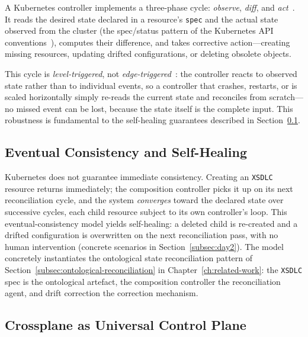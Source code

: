 A Kubernetes controller implements a three-phase cycle: \textit{observe}, \textit{diff}, and \textit{act}~\cite{k8s-controllers}. It reads the desired state declared in a resource's \texttt{spec} and the actual state observed from the cluster (the spec/status pattern of the Kubernetes API conventions~\cite{k8s-api-conventions}), computes their difference, and takes corrective action---creating missing resources, updating drifted configurations, or deleting obsolete objects.

This cycle is \textit{level-triggered}, not \textit{edge-triggered}~\cite{k8s-up-and-running}: the controller reacts to observed state rather than to individual events, so a controller that crashes, restarts, or is scaled horizontally simply re-reads the current state and reconciles from scratch---no missed event can be lost, because the state itself is the complete input. This robustness is fundamental to the self-healing guarantees described in Section~\ref{subsec:self-healing}.

\subsection{Eventual Consistency and Self-Healing}
\label{subsec:self-healing}

Kubernetes does not guarantee immediate consistency. Creating an \texttt{XSDLC} resource returns immediately; the composition controller picks it up on its next reconciliation cycle, and the system \textit{converges} toward the declared state over successive cycles, each child resource subject to its own controller's loop. This eventual-consistency model yields self-healing: a deleted child is re-created and a drifted configuration is overwritten on the next reconciliation pass, with no human intervention (concrete scenarios in Section~\ref{subsec:day2}). The model concretely instantiates the ontological state reconciliation pattern of Section~\ref{subsec:ontological-reconciliation} in Chapter~\ref{ch:related-work}: the \texttt{XSDLC} spec is the ontological artefact, the composition controller the reconciliation agent, and drift correction the correction mechanism.

\subsection{Crossplane as Universal Control Plane}
\label{subsec:crossplane-control-plane}

